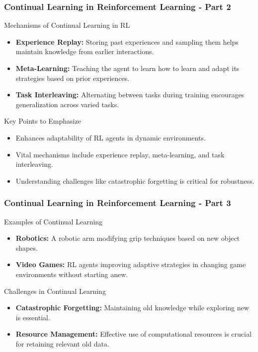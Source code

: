 \documentclass[aspectratio=169]{beamer}
\begin{document}
\begin{frame}[fragile]
    \frametitle{Continual Learning in Reinforcement Learning - Part 2}
    \begin{block}{Mechanisms of Continual Learning in RL}
        \begin{itemize}
            \item \textbf{Experience Replay:} Storing past experiences and sampling them helps maintain knowledge from earlier interactions.
            \item \textbf{Meta-Learning:} Teaching the agent to learn how to learn and adapt its strategies based on prior experiences.
            \item \textbf{Task Interleaving:} Alternating between tasks during training encourages generalization across varied tasks.
        \end{itemize}
    \end{block}

    \begin{block}{Key Points to Emphasize}
        \begin{itemize}
            \item Enhances adaptability of RL agents in dynamic environments.
            \item Vital mechanisms include experience replay, meta-learning, and task interleaving.
            \item Understanding challenges like catastrophic forgetting is critical for robustness.
        \end{itemize}
    \end{block}
\end{frame}

\begin{frame}[fragile]
    \frametitle{Continual Learning in Reinforcement Learning - Part 3}
    \begin{block}{Examples of Continual Learning}
        \begin{itemize}
            \item \textbf{Robotics:} A robotic arm modifying grip techniques based on new object shapes.
            \item \textbf{Video Games:} RL agents improving adaptive strategies in changing game environments without starting anew.
        \end{itemize}
    \end{block}

    \begin{block}{Challenges in Continual Learning}
        \begin{itemize}
            \item \textbf{Catastrophic Forgetting:} Maintaining old knowledge while exploring new is essential.
            \item \textbf{Resource Management:} Effective use of computational resources is crucial for retaining relevant old data.
        \end{itemize}
    \end{block}
\end{frame}
\end{document}
